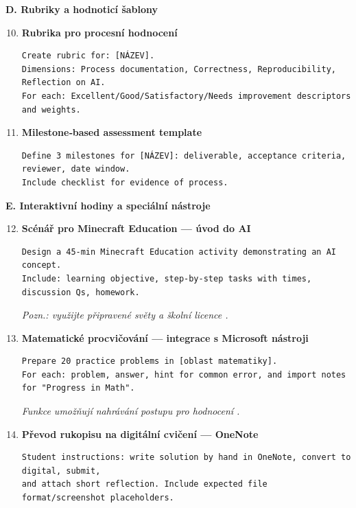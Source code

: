 \medskip

\textbf{D. Rubriky a hodnoticí šablony}

\begin{enumerate}
  \setcounter{enumi}{9}
  \item \textbf{Rubrika pro procesní hodnocení}
  \begin{verbatim}
Create rubric for: [NÁZEV].
Dimensions: Process documentation, Correctness, Reproducibility, Reflection on AI.
For each: Excellent/Good/Satisfactory/Needs improvement descriptors and weights.
  \end{verbatim}
  \item \textbf{Milestone‑based assessment template}
  \begin{verbatim}
Define 3 milestones for [NÁZEV]: deliverable, acceptance criteria, reviewer, date window.
Include checklist for evidence of process.
  \end{verbatim}
\end{enumerate}

\medskip

\textbf{E. Interaktivní hodiny a speciální nástroje}

\begin{enumerate}
  \setcounter{enumi}{11}
  \item \textbf{Scénář pro Minecraft Education — úvod do AI}
  \begin{verbatim}
Design a 45-min Minecraft Education activity demonstrating an AI concept.
Include: learning objective, step-by-step tasks with times, discussion Qs, homework.
  \end{verbatim}
  \textit{Pozn.: využijte připravené světy a školní licence \cite{kb_ai_101_tipu_pdf_04e4a115_page_15_2}.}
  \item \textbf{Matematické procvičování — integrace s Microsoft nástroji}
  \begin{verbatim}
Prepare 20 practice problems in [oblast matematiky].
For each: problem, answer, hint for common error, and import notes for "Progress in Math".
  \end{verbatim}
  \textit{Funkce umožňují nahrávání postupu pro hodnocení \cite{kb_ai_101_tipu_pdf_04e4a115_page_8_1}.}
  \item \textbf{Převod rukopisu na digitální cvičení — OneNote}
  \begin{verbatim}
Student instructions: write solution by hand in OneNote, convert to digital, submit,
and attach short reflection. Include expected file format/screenshot placeholders.
  \end{verbatim}
\end{enumerate}

